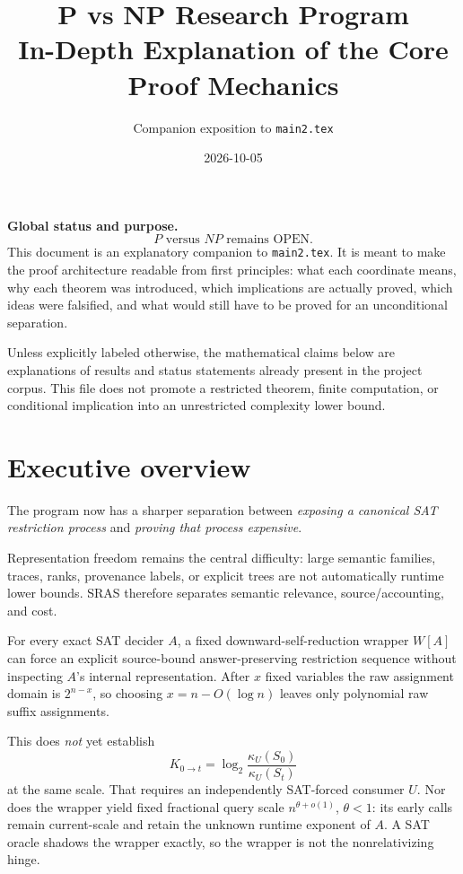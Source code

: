\documentclass[11pt]{article}
\title{\bfseries P vs NP Research Program\\[0.25em]
\Large In-Depth Explanation of the Core Proof Mechanics}
\author{Companion exposition to \texttt{main2.tex}}
\date{2026-10-05}
\theoremstyle{plain}
\theoremstyle{definition}
\theoremstyle{remark}
\begin{document}
\maketitle

\begin{statusbox}
\textbf{Global status and purpose.}
\[
\boxed{\text{$P$ versus $NP$ remains OPEN.}}
\]
This document is an explanatory companion to \texttt{main2.tex}.  It is meant
to make the proof architecture readable from first principles: what each
coordinate means, why each theorem was introduced, which implications are
actually proved, which ideas were falsified, and what would still have to be
proved for an unconditional separation.

Unless explicitly labeled otherwise, the mathematical claims below are
explanations of results and status statements already present in the project
corpus.  This file does not promote a restricted theorem, finite computation,
or conditional implication into an unrestricted complexity lower bound.
\end{statusbox}

\tableofcontents
\bigskip

\section{Executive overview}

The program now has a sharper separation between \emph{exposing a canonical
SAT restriction process} and \emph{proving that process expensive}.

Representation freedom remains the central difficulty: large semantic
families, traces, ranks, provenance labels, or explicit trees are not
automatically runtime lower bounds.  SRAS therefore separates semantic
relevance, source/accounting, and cost.

For every exact SAT decider \(A\), a fixed downward-self-reduction wrapper
\(W[A]\) can force an explicit source-bound answer-preserving restriction
sequence without inspecting \(A\)'s internal representation.  After \(x\)
fixed variables the raw assignment domain is \(2^{n-x}\), so choosing
\(x=n-O(\log n)\) leaves only polynomial raw suffix assignments.

This does \emph{not} yet establish
\[
K_{0\to t}
=
\log_2\frac{\kappa_U(S_0)}{\kappa_U(S_t)}
\]
at the same scale.  That requires an independently SAT-forced consumer
\(U\).  Nor does the wrapper yield fixed fractional query scale
\(n^{\theta+o(1)}\), \(\theta<1\): its early calls remain current-scale and
retain the unknown runtime exponent of \(A\).  A SAT oracle shadows the wrapper
exactly, so the wrapper is not the nonrelativizing hinge.
\end{document}
